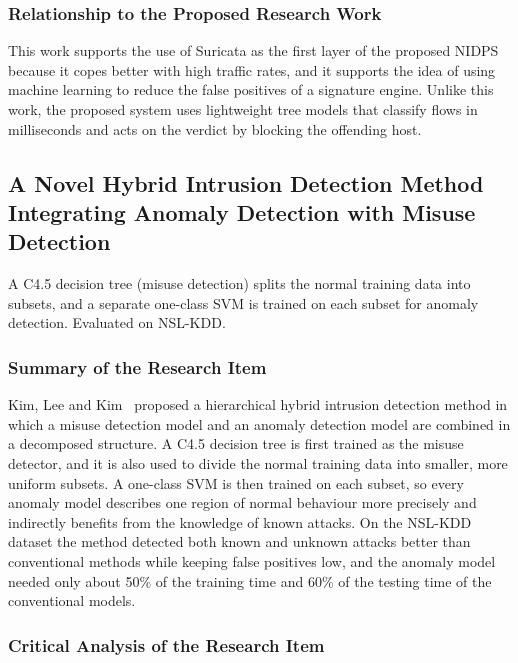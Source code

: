 \subsubsection{Relationship to the Proposed Research Work}\label{sec:3.2.1.3}

\noindent This work supports the use of Suricata as the first layer of the proposed NIDPS because it copes better with high traffic rates, and it supports the idea of using machine learning to reduce the false positives of a signature engine. Unlike this work, the proposed system uses lightweight tree models that classify flows in milliseconds and acts on the verdict by blocking the offending host.

\subsection{A Novel Hybrid Intrusion Detection Method Integrating Anomaly Detection with Misuse Detection}\label{sec:3.2.2}

\noindent A C4.5 decision tree (misuse detection) splits the normal training data into subsets, and a separate one-class SVM is trained on each subset for anomaly detection. Evaluated on NSL-KDD.

\subsubsection{Summary of the Research Item}\label{sec:3.2.2.1}

\noindent Kim, Lee and Kim~\cite{lr:kim2014} proposed a hierarchical hybrid intrusion detection method in which a misuse detection model and an anomaly detection model are combined in a decomposed structure. A C4.5 decision tree is first trained as the misuse detector, and it is also used to divide the normal training data into smaller, more uniform subsets. A one-class SVM is then trained on each subset, so every anomaly model describes one region of normal behaviour more precisely and indirectly benefits from the knowledge of known attacks. On the NSL-KDD dataset the method detected both known and unknown attacks better than conventional methods while keeping false positives low, and the anomaly model needed only about 50\% of the training time and 60\% of the testing time of the conventional models.

\subsubsection{Critical Analysis of the Research Item}\label{sec:3.2.2.2}

